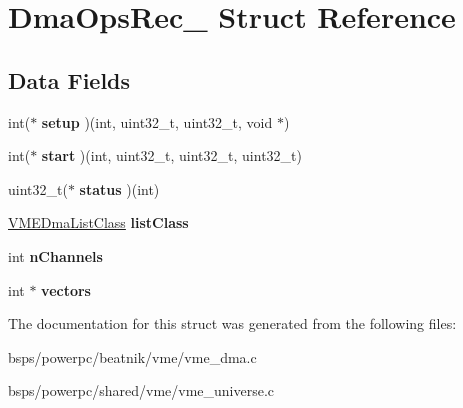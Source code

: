 \hypertarget{structDmaOpsRec__}{}\section{Dma\+Ops\+Rec\+\_\+ Struct Reference}
\label{structDmaOpsRec__}
\subsection*{Data Fields}
\begin{DoxyCompactItemize}
\item 
\mbox{\label{structDmaOpsRec___a465408791293afd46569d574b585f93f}} 
int($\ast$ {\bfseries setup} )(int, uint32\+\_\+t, uint32\+\_\+t, void $\ast$)
\item 
\mbox{\label{structDmaOpsRec___a8cdea8e2ebeb062ca48c56dbc13b567e}} 
int($\ast$ {\bfseries start} )(int, uint32\+\_\+t, uint32\+\_\+t, uint32\+\_\+t)
\item 
\mbox{\label{structDmaOpsRec___ae37a9e4020737af2cdc147825a16e639}} 
uint32\+\_\+t($\ast$ {\bfseries status} )(int)
\item 
\mbox{\label{structDmaOpsRec___a1b48ee558263024baeeef8f951360342}} 
\mbox{\hyperlink{structVMEDmaListClassRec__}{V\+M\+E\+Dma\+List\+Class}} {\bfseries list\+Class}
\item 
\mbox{\label{structDmaOpsRec___af1b3114b71293e13d7ccde9ccc86cec6}} 
int {\bfseries n\+Channels}
\item 
\mbox{\label{structDmaOpsRec___a7cd6a08405bade617594cbb2dacacb78}} 
int $\ast$ {\bfseries vectors}
\end{DoxyCompactItemize}


The documentation for this struct was generated from the following files\+:\begin{DoxyCompactItemize}
\item 
bsps/powerpc/beatnik/vme/vme\+\_\+dma.\+c\item 
bsps/powerpc/shared/vme/vme\+\_\+universe.\+c\end{DoxyCompactItemize}
